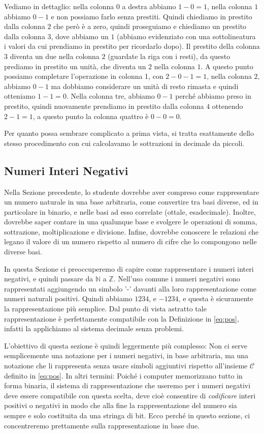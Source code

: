 Vediamo in dettaglio: nella colonna $0$ a destra abbiamo $1-0 = 1$,
nella colonna $1$ abbiamo $0-1$ e non possiamo farlo senza prestiti. 
Quindi chiediamo in prestito dalla colonna $2$ che però è a zero, quindi proseguiamo e chiediamo un prestito dalla colonna $3$, dove abbiamo un $1$ (abbiamo evidenziato con una sottolineatura i valori da cui prendiamo in prestito per ricordarlo dopo).
Il prestito della colonna $3$ diventa un due nella colonna $2$ (guardate la riga con i resti), da questo prediamo in prestito un unità, che diventa un $2$ nella colonna $1$.
A questo punto possiamo completare l'operazione in colonna 1, con $2-0-1 = 1$,
nella colonna $2$, abbiamo $0 - 1$ ma dobbiamo considerare un unità di resto rimasta e quindi otteniamo $1 - 1 = 0$. Nella colonna tre, abbiamo $0-1$ perché abbiamo preso in prestito, quindi nuovamente prendiamo in prestito dalla colonna $4$ ottenendo $2-1 = 1$, a questo punto la colonna quattro è $0-0=0$.

Per quanto possa sembrare complicato a prima vista, si tratta esattamente
dello stesso procedimento con cui calcolavamo le sottrazioni in decimale da piccoli.


\subsection{Numeri Interi Negativi}

Nella Sezione precedente, lo studente dovrebbe aver compreso come rappresentare
un numero naturale in una base arbitraria, come convertire tra basi diverse, ed
in particolare in binario, e nelle basi ad esso correlate (ottale,
esadecimale). Inoltre, dovrebbe saper contare in una qualunque base e svolgere
le operazioni di somma, sottrazione, moltiplicazione e divisione. Infine,
dovrebbe conoscere le relazioni che legano il valore di un numero rispetto al
numero di cifre che lo compongono nelle diverse basi.

In questa Sezione ci preoccuperemo di capire come rappresentare i numeri interi negativi, e quindi passare da $\mathbb{N}$ a $\mathbb{Z}$. Nell'uso comune i numeri negativi sono rappresentati aggiungendo un simbolo '-' davanti alla loro rappresentazione come numeri naturali positivi. Quindi abbiamo $1234$, e $-1234$, e questa è sicuramente la rappresentazione più semplice. Dal punto di vista astratto tale rappresentazione è perfettamente compatibile con la Definizione in \eqref{eq:pos}, infatti la applichiamo al sistema decimale senza problemi.

L'obiettivo di questa sezione è quindi leggermente più complesso: Non ci serve semplicemente una notazione per i numeri negativi, in base arbitraria, ma una notazione che li rappresenta senza usare simboli aggiuntivi rispetto all'insieme $\mathcal{C}$ definito in \eqref{eq:pos}. In altri termini: Poiché i computer memorizzano tutto in forma binaria, il sistema di rappresentazione che useremo per i numeri negativi deve essere compatibile con questa scelta, deve cioè consentire di \emph{codificare} interi positivi o negativi in modo che alla fine la rappresentazione del numero sia sempre e solo costituita da una stringa di bit. Ecco perché in questo sezione, ci concentreremo prettamente sulla rappresentazione in base due.

